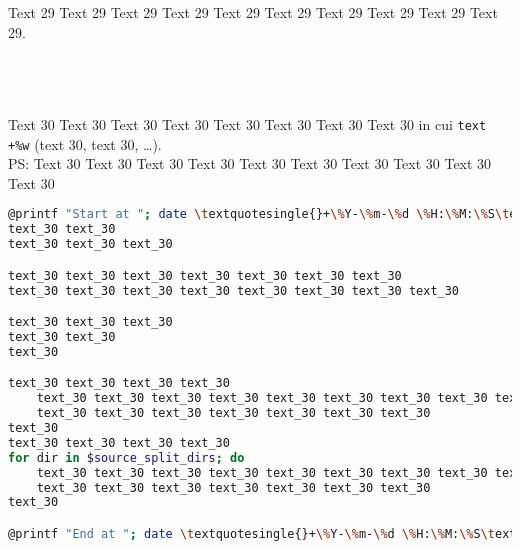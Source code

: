 \documentclass[9pt]{exam}
\begin{document}
\begin{questions}
\question
    Text 29 Text 29 Text 29 Text 29 Text 29 Text 29 Text 29 Text 29 
    Text 29 Text 29.\\\\
    \makebox[0.9\textwidth]{\$ \enspace\hrulefill}\\\\
    \makebox[0.9\textwidth]{\enspace\hrulefill}

\question
    Text 30 Text 30 Text 30 Text 30 Text 30 Text 30 Text 30 Text 30 
    in cui \textquotedbl{}\texttt{text \textquotesingle{}+\%w\textquotesingle{}}\textquotedbl{}
    (text $30$, text $30$, \dots{}).\\
    PS: Text 30 Text 30 Text 30 Text 30 Text 30
        Text 30 Text 30 Text 30 Text 30 Text 30
\begin{lstlisting}[language=Bash, caption=Text 30 Text 30 Text 30 Text 30 Text 30]
@printf "Start at "; date \textquotesingle{}+\%Y-\%m-\%d \%H:\%M:\%S\textquotesingle{}@
text_30 text_30 
text_30 text_30 text_30

text_30 text_30 text_30 text_30 text_30 text_30 text_30
text_30 text_30 text_30 text_30 text_30 text_30 text_30 text_30

text_30 text_30 text_30
text_30 text_30
text_30

text_30 text_30 text_30 text_30
    text_30 text_30 text_30 text_30 text_30 text_30 text_30 text_30 text_30 text_30
    text_30 text_30 text_30 text_30 text_30 text_30 text_30
text_30
text_30 text_30 text_30 text_30
for dir in $source_split_dirs; do
    text_30 text_30 text_30 text_30 text_30 text_30 text_30 text_30 text_30 text_30
    text_30 text_30 text_30 text_30 text_30 text_30 text_30
text_30

@printf "End at "; date \textquotesingle{}+\%Y-\%m-\%d \%H:\%M:\%S\textquotesingle{}@
\end{lstlisting}
    \makebox[0.9\textwidth]{\$ \enspace\hrulefill}\\\\
    \makebox[0.9\textwidth]{\enspace\hrulefill}\\\\
    \makebox[0.9\textwidth]{\enspace\hrulefill}\\\\
    \makebox[0.9\textwidth]{\enspace\hrulefill}

\end{questions}
\end{document}
